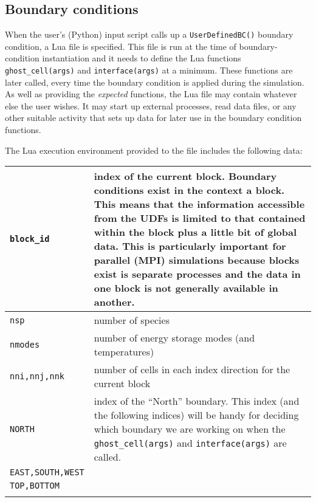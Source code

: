 \subsection{Boundary conditions}
%
When the user's (Python) input script calls up a \texttt{UserDefinedBC()} boundary condition,
a Lua file is specified.
This file is run at the time of boundary-condition instantiation and it needs to define the
Lua functions \texttt{ghost\_cell(args)} and \texttt{interface(args)} at a minimum.
These functions are later called, every time the boundary condition is applied during the simulation.
As well as providing the \textit{expected} functions, the Lua file may contain whatever else
the user wishes.
It may start up external processes, read data files, or any other suitable activity that
sets up data for later use in the boundary condition functions.

\medskip
The Lua execution environment provided to the file includes the following data:\\
\vspace{1mm}
\begin{tabular}{ll} 
 \hline \noalign{\smallskip}
 \texttt{block\_id} & \parbox{10cm}{index of the current block. 
                                   Boundary conditions exist in the context a block.
                                   This means that the information accessible from the UDFs is limited
                                   to that contained within the block plus a little bit of global data.
                                   This is particularly important for parallel (MPI) simulations
                                   because blocks exist is separate processes and the data in one
                                   block is not generally available in another.} \\ \hline
 \texttt{nsp} & number of species \\
 \texttt{nmodes} & number of energy storage modes (and temperatures) \\
 \texttt{nni,nnj,nnk} &  number of cells in each index direction for the current block \\
 \noalign{\smallskip} \hline \noalign{\smallskip}
 \texttt{NORTH} & \parbox{10cm}{index of the ``North'' boundary.
                               This index (and the following indices) will be handy for deciding which boundary we are
                               working on when the \texttt{ghost\_cell(args)} and \texttt{interface(args)} 
                               are called.}\\
 \texttt{EAST,SOUTH,WEST} &  \\
 \texttt{TOP,BOTTOM} &  \\
 \noalign{\smallskip} \hline \noalign{\smallskip}
\end{tabular}

